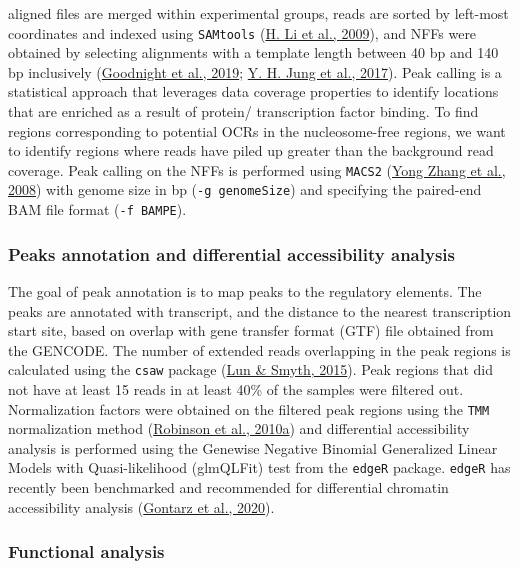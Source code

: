 \documentclass[12pt,twoside]{reedthesis}
\begin{document}
aligned files are merged within experimental groups, reads are sorted by
left-most coordinates and indexed using \texttt{SAMtools} (\protect\hyperlink{ref-li2009}{H. Li et al., 2009}), and NFFs
were obtained by selecting alignments with a template length between 40 bp
and 140 bp inclusively (\protect\hyperlink{ref-goodnight2019}{Goodnight et al., 2019}; \protect\hyperlink{ref-jung2017}{Y. H. Jung et al., 2017}). Peak calling is a
statistical approach that leverages data coverage properties to identify
locations that are enriched as a result of protein/ transcription factor
binding. To find regions corresponding to potential OCRs in the
nucleosome-free regions, we want to identify regions where reads have
piled up greater than the background read coverage. Peak calling on the
NFFs is performed using \texttt{MACS2} (\protect\hyperlink{ref-zhang2008}{Yong Zhang et al., 2008}) with genome size in bp
(\texttt{-g\ genomeSize}) and specifying the paired-end BAM file format (\texttt{-f\ BAMPE}).

\hypertarget{m3.3.2}{%
\subsubsection*{Peaks annotation and differential accessibility analysis}\label{m3.3.2}}

The goal of peak annotation is to map peaks to the regulatory elements.
The peaks are annotated with transcript, and the distance to the nearest
transcription start site, based on overlap with gene transfer format
(GTF) file obtained from the GENCODE. The number of extended reads
overlapping in the peak regions is calculated using the \texttt{csaw} package
(\protect\hyperlink{ref-lun2015}{Lun \& Smyth, 2015}). Peak regions that did not have at least 15 reads in at least
40\% of the samples were filtered out. Normalization factors were
obtained on the filtered peak regions using the \texttt{TMM} normalization
method (\protect\hyperlink{ref-robinson2010}{Robinson et al., 2010a}) and differential accessibility analysis is
performed using the Genewise Negative Binomial Generalized Linear Models
with Quasi-likelihood (glmQLFit) test from the \texttt{edgeR} package. \texttt{edgeR}
has recently been benchmarked and recommended for differential chromatin
accessibility analysis (\protect\hyperlink{ref-gontarz2020}{Gontarz et al., 2020}).

\hypertarget{m3.3.3}{%
\subsubsection*{Functional analysis}\label{m3.3.3}}
\end{document}

